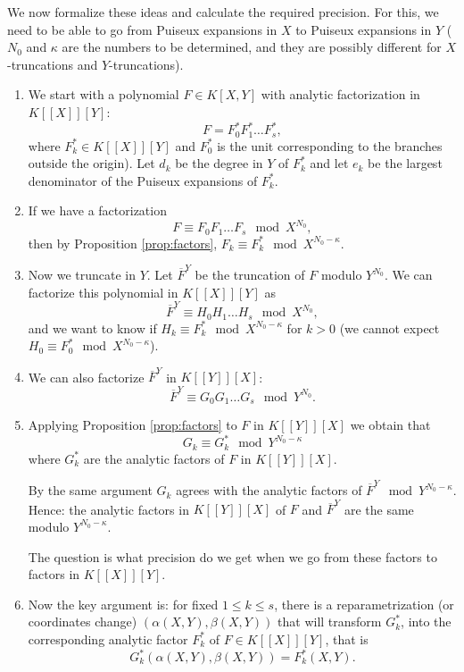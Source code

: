\documentclass[a4paper,11pt,reqno]{amsart}%
\theoremstyle{definition}
\theoremstyle{plain}
\theoremstyle{remark}
\begin{document}
We now formalize these ideas and calculate the required precision. For this, we need to be able to go from Puiseux expansions in $X$ to Puiseux expansions in $Y$ ($N_0$ and $\kappa$ are the numbers to be determined, and they are possibly different for $X$-truncations and $Y$-truncations).

\begin{enumerate}
\item We start with a polynomial $F \in K[X,Y]$ with analytic factorization in $K[[X]][Y]$:
$$
F = F_0^* F_1^* \dots F_s^*,$$
where $F_k^* \in K[[X]][Y]$ and $F_0^*$ is the unit corresponding to the branches outside the origin). Let $d_k$ be the degree in $Y$ of $F_k^*$ and let $e_k$ be the largest denominator of the Puiseux expansions of $F_k^*$.

\item If we have a factorization
\begin{equation} \label{FXfactors}
F \equiv  F_0 F_1 \dots F_s \mod X^{N_0},
\end{equation}
then by Proposition \ref{prop:factors}, $F_k \equiv F_k^* \mod X^{N_0 - \kappa}$.


\item Now we truncate in $Y$. Let $\overline{F}^{Y}$ be the truncation of $F$ modulo $Y^{N_0}$. We can factorize this polynomial in $K[[X]][Y]$ as
$$
\overline{F}^{Y} \equiv  {H}_0 {H}_1 \dots {H}_s \mod X^{N_0},
$$
and we want to know if ${H}_k \equiv F^*_k \mod X^{N_0 - \kappa}$ for $k > 0$ (we cannot expect $H_0 \equiv F_0^* \mod X^{N_0 - \kappa}$).

\item We can also factorize $\overline{F}^{Y}$ in $K[[Y]][X]$:
$$\overline{F}^{Y} \equiv G_0 G_1 \dots G_s \mod Y^{N_0}.$$

\item Applying Proposition \ref{prop:factors} to ${F}$ in $K[[Y]][X]$  we obtain that
$$G_k \equiv G_k^* \mod Y^{N_0 - \kappa}$$
where $G_k^*$ are the analytic factors of $F$ in $K[[Y]][X]$.

By the same argument $G_k$ agrees with the analytic factors of $\overline{F}^{Y} \mod Y^{N_0 - \kappa}$.
Hence: the analytic factors in $K[[Y]][X]$ of $F$ and $\overline{F}^{Y}$ are the same modulo $Y^{N_0 - \kappa}$.

The question is what precision do we get when we go from these factors to factors in $K[[X]][Y]$.

\item Now the key argument is: for fixed $1 \le k \le s$, there is a reparametrization (or coordinates change) $(\alpha(X,Y), \beta(X,Y))$ that will transform $G_k^*$, into the corresponding analytic factor $F_k^*$ of $F \in K[[X]][Y]$, that is
$$
G_k^*(\alpha(X,Y), \beta(X,Y)) = F_k^*(X,Y).
$$


\end{enumerate}
\end{document}

